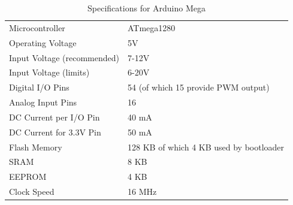 \begin{table}
\begin{tabular}{| l | l |}
\hline
Microcontroller & ATmega1280\\
Operating Voltage & 5V\\
Input Voltage (recommended) & 7-12V\\
Input Voltage (limits) & 6-20V\\
Digital I/O Pins & 54 (of which 15 provide PWM output)\\
Analog Input Pins & 16\\
DC Current per I/O Pin & 40 mA\\
DC Current for 3.3V Pin & 50 mA\\
Flash Memory & 128 KB of which 4 KB used by bootloader\\
SRAM & 8 KB\\
EEPROM & 4 KB\\
Clock Speed & 16 MHz\\
\hline
\end{tabular}
\caption{Specifications for Arduino Mega}
\end{table}
\label{tab:megaspec}
